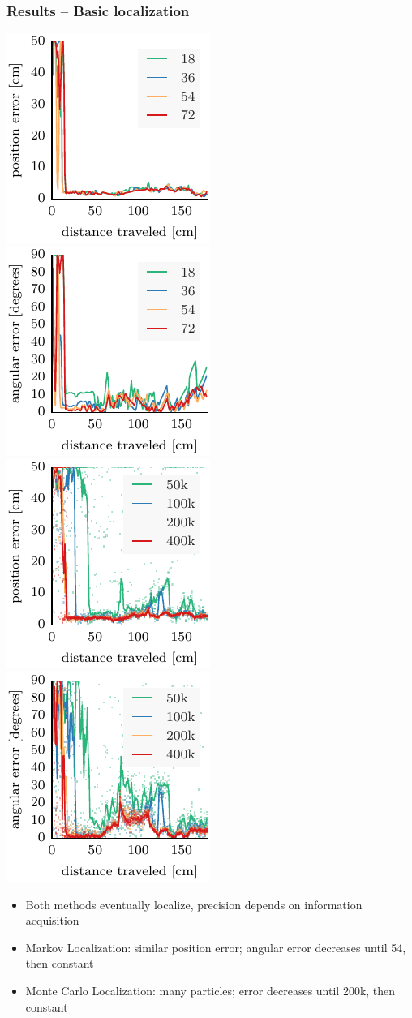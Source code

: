 \documentclass[lualatex,aspectratio=169,xcolor=dvipsnames,10pt,c]{beamer}
\begin{document}
\frame
{
	\frametitle{Results – Basic localization}
	
	\hfill
	
	{\footnotesize
	\makebox[.5\textwidth][c]{\textcolor{gray}{varying number of discretization angles}}\hfill
	\makebox[.5\textwidth][c]{\textcolor{gray}{varying number of particles}}
	}
	
	\includegraphics[width=.23\columnwidth]{ml-whole_random_2-xy}\hfill
	\includegraphics[width=.23\columnwidth]{ml-whole_random_2-theta}\hfill\hfill
	\includegraphics[width=.23\columnwidth]{mcl-whole_random_2-xy}\hfill
	\includegraphics[width=.23\columnwidth]{mcl-whole_random_2-theta}
	
	\vspace{1em}

	\begin{itemize}
	\item Both methods eventually localize, precision depends on information acquisition
	\item Markov Localization: similar position error; angular error decreases until 54, then constant
	\item Monte Carlo Localization: many particles; error decreases until 200k, then constant
	\end{itemize}
}
\end{document}
